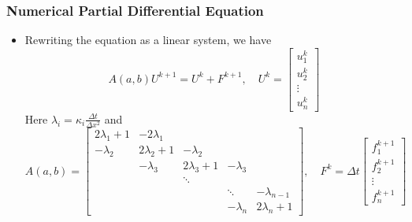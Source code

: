 \documentclass{beamer}
\begin{document}
\begin{frame}
	\frametitle{Numerical Partial Differential Equation}
	
	\begin{itemize}
		\item Rewriting the equation as a linear system, we have
		$$A(a,b)U^{k+1} = U^k + F^{k+1}, \quad U^k = \begin{bmatrix}u_1^k\\u_2^k\\\vdots \\u_n^k\end{bmatrix}$$
		Here $\lambda_i = \kappa_i \frac{\Delta t}{\Delta x^2}$ and 
		{\footnotesize
		\begin{equation*}
		A(a,b) = \begin{bmatrix}
2\lambda_1+1 & -2\lambda_1  &  & & \\
-\lambda_2 & 2\lambda_2+1 & -\lambda_2 & & \\
 & -\lambda_3 & 2\lambda_3 + 1 & -\lambda_3 & \\
& &\ddots & & \\
& & &\ddots & -\lambda_{n-1}\\
&&& -\lambda_n & 2\lambda_n+1
\end{bmatrix},\quad F^k = \Delta t \begin{bmatrix}
f_1^{k+1} \\
f_2^{k+1} \\
\vdots\\
f_n^{k+1}
\end{bmatrix}	
		\end{equation*}
		}
		
	\end{itemize}
\end{frame}
\end{document}
